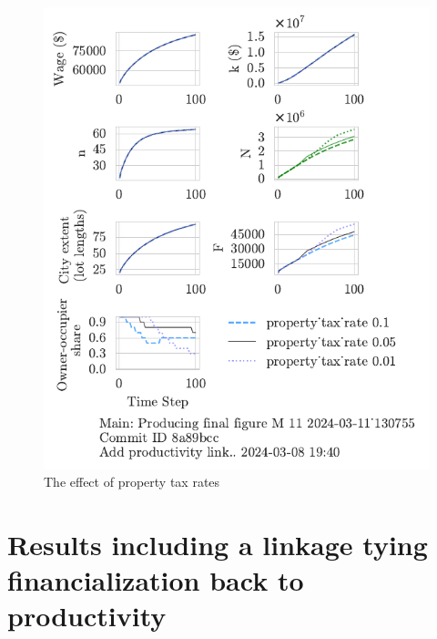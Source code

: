 \begin{figure}[h!tb]
    \centering
    \includegraphics[scale=.8, trim={0 1.4cm 0 0},clip]{fig/property_tax_rate-Main-130755.pdf}
    \caption{The effect of property tax rates}
    \label{fig:property_tax_ownership_trajectory}
\end{figure}


\section{Results including a linkage tying financialization back to productivity}
